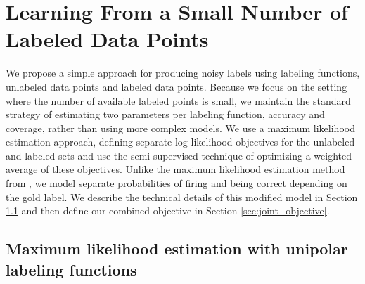 \section{Learning From a Small Number of Labeled Data Points}

We propose a simple approach for producing noisy labels using labeling functions, unlabeled data points and labeled data points. Because we focus on the setting where the number of available labeled points is small, we maintain the standard strategy of estimating two parameters per labeling function, accuracy and coverage, rather than using more complex models. We use a maximum likelihood estimation approach, defining separate log-likelihood objectives for the unlabeled and labeled sets and use the semi-supervised technique of optimizing a weighted average of these objectives. Unlike the maximum likelihood estimation method from \cite{alex2016data}, we model separate probabilities of firing and being correct depending on the gold label. We describe the technical details of this modified model in Section \ref{sec:mle_unipolar} and then define our combined objective in Section \ref{sec:joint_objective}.

\subsection{Maximum likelihood estimation with unipolar labeling functions}
\label{sec:mle_unipolar}

